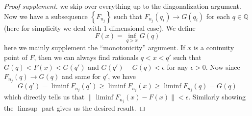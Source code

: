 \documentclass{article}
\begin{document}
\begin{proof}[Proof supplement] we skip over everything up to the diagonalization argument. Now we have a subsequence \( \left\{ F_{n_j} \right\}\) such that \(F_{n_j}(q_i) \to G(q_i)\) for each $q \in \mathbb{Q}$ (here for simplicity we deal with 1-dimensional case). We define
    \begin{equation}
        F(x) = \inf_{q > x} G(q)
    \end{equation}
    here we mainly supplement the ``monotonicity'' argument. If $x$ is a coninuity point of $F$, then we can always find rationals $q < x < q'$ such that $G(q) < F(x) < G(q')$ and $G(q') - G(q) < \epsilon$ for any $\epsilon > 0$. Now since $F_{n_j}(q) \to G(q)$ and same for $q'$, we have
    \begin{equation}
        G(q') = \liminf F_{n_j}(q') \geq \liminf F_{n_j}(x) \geq \liminf F_{n_j}(q) = G(q)
    \end{equation}
    which directly tells us that $\|\liminf F_{n_j}(x) - F(x)\| < \epsilon$. Similarly showing the $\limsup$ part gives us the desired result.
\end{proof}
\end{document}

